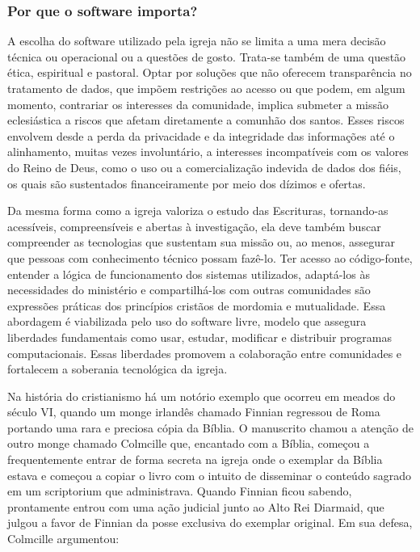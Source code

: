 \subsubsection{Por que o software importa?}

A escolha do software utilizado pela igreja não se limita a uma mera decisão técnica ou operacional ou a questões de gosto. Trata-se também de uma questão ética, espiritual e pastoral. Optar por soluções que não oferecem transparência no tratamento de dados, que impõem restrições ao acesso ou que podem, em algum momento, contrariar os interesses da comunidade, implica submeter a missão eclesiástica a riscos que afetam diretamente a comunhão dos santos. Esses riscos envolvem desde a perda da privacidade e da integridade das informações até o alinhamento, muitas vezes involuntário, a interesses incompatíveis com os valores do Reino de Deus, como o uso ou a comercialização indevida de dados dos fiéis, os quais são sustentados financeiramente por meio dos dízimos e ofertas.

Da mesma forma como a igreja valoriza o estudo das Escrituras, tornando-as acessíveis, compreensíveis e abertas à investigação, ela deve também buscar compreender as tecnologias que sustentam sua missão ou, ao menos, assegurar que pessoas com conhecimento técnico possam fazê-lo. Ter acesso ao código-fonte, entender a lógica de funcionamento dos sistemas utilizados, adaptá-los às necessidades do ministério e compartilhá-los com outras comunidades são expressões práticas dos princípios cristãos de mordomia e mutualidade. Essa abordagem é viabilizada pelo uso do software livre, modelo que assegura liberdades fundamentais como usar, estudar, modificar e distribuir programas computacionais. Essas liberdades promovem a colaboração entre comunidades e fortalecem a soberania tecnológica da igreja.

Na história do cristianismo há um notório exemplo que ocorreu em meados do século VI, quando um monge irlandês chamado Finnian regressou de Roma portando uma rara e preciosa cópia da Bíblia. O manuscrito chamou a atenção de outro monge chamado Colmcille que, encantado com a Bíblia, começou a frequentemente entrar de forma secreta na igreja onde o exemplar da Bíblia estava e começou a copiar o livro com o intuito de disseminar o conteúdo sagrado em um \foreignlanguage{latin}{scriptorium} que administrava. Quando Finnian ficou sabendo, prontamente entrou com uma ação judicial junto ao Alto Rei Diarmaid, que julgou a favor de Finnian da posse exclusiva do exemplar original. Em sua defesa, Colmcille argumentou:


